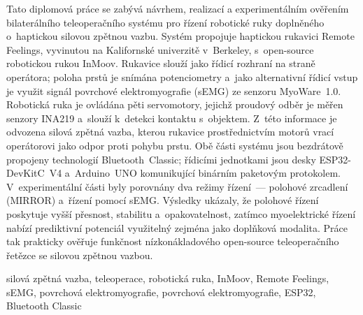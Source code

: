 \documentclass[FZS,DP]{tulthesis}
\begin{document}

\begin{abstractCZ}
Tato diplomová práce se zabývá návrhem, realizací a experimentálním ověřením
bilaterálního teleoperačního systému pro řízení robotické ruky doplněného
o~haptickou silovou zpětnou vazbu. Systém propojuje haptickou rukavici Remote
Feelings, vyvinutou na Kalifornské univerzitě v~Berkeley, s~open-source
robotickou rukou InMoov. Rukavice slouží jako řídicí rozhraní na straně
operátora; poloha prstů je snímána potenciometry a~jako alternativní řídicí
vstup je využit signál povrchové elektromyografie (sEMG) ze senzoru MyoWare~1.0.
Robotická ruka je ovládána pěti servomotory, jejichž proudový odběr je měřen
senzory INA219 a~slouží k~detekci kontaktu s~objektem. Z~této informace je
odvozena silová zpětná vazba, kterou rukavice prostřednictvím motorů vrací
operátorovi jako odpor proti pohybu prstu. Obě části systému jsou bezdrátově
propojeny technologií Bluetooth~Classic; řídicími jednotkami jsou desky
ESP32-DevKitC~V4 a~Arduino~UNO komunikující binárním paketovým protokolem.
V~experimentální části byly porovnány dva režimy řízení~--- polohové zrcadlení
(MIRROR) a~řízení pomocí sEMG. Výsledky ukázaly, že polohové řízení poskytuje
vyšší přesnost, stabilitu a~opakovatelnost, zatímco myoelektrické řízení nabízí
prediktivní potenciál využitelný zejména jako doplňková modalita. Práce tak
prakticky ověřuje funkčnost nízkonákladového open-source teleoperačního řetězce
se silovou zpětnou vazbou.
\end{abstractCZ}

\begin{keywordsCZ}
silová zpětná vazba, teleoperace, robotická ruka, InMoov, Remote Feelings, sEMG, povrchová elektromyografie, povrchová elektromyografie, ESP32, Bluetooth Classic
\end{keywordsCZ}

\vspace{2cm}
\end{document}
